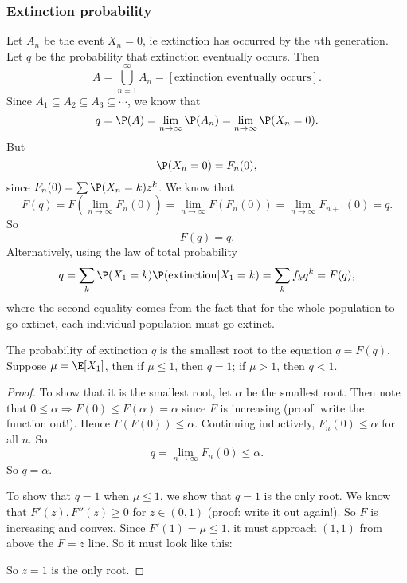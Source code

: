\documentclass[a4paper]{article}
\begin{document}
\subsubsection*{Extinction probability}
Let $A_n$ be the event $X_n = 0$, ie extinction has occurred by the $n$th generation. Let $q$ be the probability that extinction eventually occurs. Then
\[
  A = \bigcup_{n = 1}^\infty A_n = [\text{extinction eventually occurs}].
\]
Since $A_1 \subseteq A_2 \subseteq A_3 \subseteq \cdots$, we know that
\[
  q = \P(A) = \lim_{n\to \infty} \P(A_n) = \lim_{n \to \infty} \P(X_n = 0).
\]
But
\[
  \P(X_n = 0) = F_n(0),
\]
since $F_n(0) = \sum \P(X_n = k)z^k$. We know that
\[
  F(q) = F\left(\lim_{n\to \infty} F_n(0)\right) = \lim_{n\to \infty} F(F_n(0)) = \lim_{n\to \infty}F_{n + 1}(0) = q.
\]
So
\[
  F(q) = q.
\]
Alternatively, using the law of total probability
\[
  q = \sum_k \P(X_1 = k) \P(\text{extinction}|X_1 = k) = \sum_k f_k q^k = F(q),
\]
where the second equality comes from the fact that for the whole population to go extinct, each individual population must go extinct.

\begin{thm}
  The probability of extinction $q$ is the smallest root to the equation $q = F(q)$. Suppose $\mu = \E[X_1]$, then if $\mu \leq 1$, then $q = 1$; if $\mu > 1$, then $q < 1$.
\end{thm}

\begin{proof}
  To show that it is the smallest root, let $\alpha$ be the smallest root. Then note that $0 \leq \alpha \Rightarrow F(0) \leq F(\alpha) = \alpha$ since $F$ is increasing (proof: write the function out!). Hence $F(F(0)) \leq \alpha$. Continuing inductively, $F_n(0) \leq \alpha$ for all $n$. So
  \[
    q = \lim_{n \to \infty}F_n(0) \leq \alpha.
  \]
  So $q = \alpha$.

  To show that $q = 1$ when $\mu \leq 1$, we show that $q = 1$ is the only root. We know that $F'(z), F''(z) \geq 0$ for $z\in (0, 1)$ (proof: write it out again!). So $F$ is increasing and convex. Since $F'(1) = \mu \leq 1$, it must approach $(1, 1)$ from above the $F = z$ line. So it must look like this:

  \begin{center}
  \end{center}
  So $z = 1$ is the only root.
\end{proof}
\end{document}
